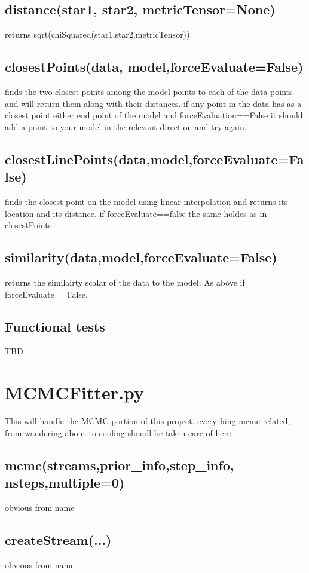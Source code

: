 \documentclass{article}
\begin{document}
\subsection{distance(star1, star2, metricTensor=None)}
returns sqrt(chiSquared(star1,star2,metricTensor))

\subsection{closestPoints(data, model,forceEvaluate=False)}
finds the two closest points among the model points to each of the data points and will return them along with their distances. 
if any point in the data has as a closest point either end point of 
the model and forceEvaluation==False it should add a point to your model in the relevant direction and try again.

\subsection{closestLinePoints(data,model,forceEvaluate=False)}
finds the closest point on the model using linear interpolation and returns its location and its distance. if forceEvaluate==false the same holdes as in closestPoints.

\subsection{similarity(data,model,forceEvaluate=False)}
returns the similairty scalar of the data to the model. As above if forceEvaluate==False.


\subsection{Functional tests}
TBD



\section{MCMCFitter.py}
This will handle the MCMC portion of this project. everything mcmc related, from wandering about to cooling shoudl be taken care of here. 

\subsection{mcmc(streams,prior\_info,step\_info, nsteps,multiple=0)}
obvious from name

\subsection{createStream(...)}
obvious from name
\end{document}
